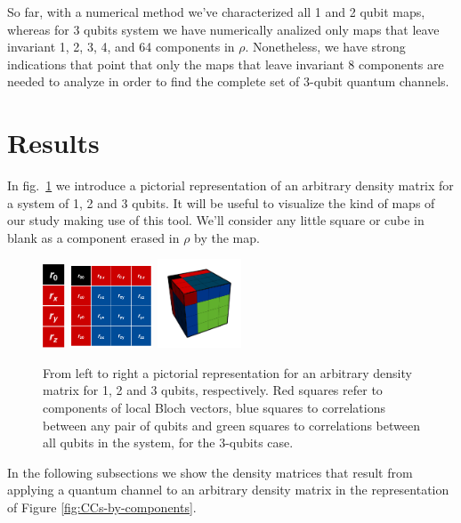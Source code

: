 \documentclass[11pt,dvipsnames]{article} %
\newcommand{\fref}[1]{fig.~\ref{#1}}  \newcommand{\tref}[1]{table~\ref{#1}}
\begin{document}

So far, with a numerical method we've characterized all 1 and 2 qubit maps, 
whereas for 3 qubits system we have numerically analized only maps that leave 
invariant 1, 2, 3, 4, and 64 components in $\rho$. Nonetheless, we have strong
indications that point that only the maps that leave invariant 8 components are 
needed to analyze in order to find the complete set of 3-qubit quantum 
channels.
\section*{Results} %
In \fref{fig:pictorial-rep-rho} we introduce a pictorial representation 
of an arbitrary density matrix for a system of 1, 2 and 3 qubits. It 
will be useful to visualize the kind of maps of our study making use
of this tool. We'll consider any little square or cube in blank
as a component erased in $\rho$ by the map.
\begin{figure}[H] %
	\centering
	\hfill \hfill
	\includegraphics[height=2.5cm]
	{img/tablero-1q}
	\hfill
	\includegraphics[width=2.5cm]
	{img/rho2q(2)}
	\hfill 
	\includegraphics[width=2.5cm]
	{img/rho-3q}
	\hfill \hfill
	\caption{From left to right a pictorial representation for an arbitrary
	density matrix for 1, 2 and 3 qubits, respectively. 
	Red squares refer to components of local Bloch vectors,
	blue squares to correlations between any pair of qubits and
	green squares to correlations between all qubits in the system, for
	the 3-qubits case.}
	\label{fig:pictorial-rep-rho}
\end{figure} %
In the following subsections we show the density matrices that result from
applying a quantum channel to an arbitrary density matrix in the representation
of Figure \ref{fig:CCs-by-components}.
\end{document}

